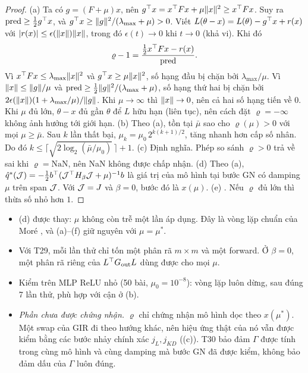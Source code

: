 \begin{proof}
(a) Ta có $g=(F+\mu)x$, nên $g^{\top} x=x^{\top} Fx+\mu\lVert x\rVert^2\ge x^{\top} Fx$. Suy ra $\mathrm{pred}\ge\tfrac12g^{\top} x$, và $g^{\top} x\ge\lVert g\rVert^2/(\lambda_{\max}+\mu)>0$.
Viết $L(\theta-x)=L(\theta)-g^{\top} x+r(x)$ với $|r(x)|\le\epsilon(\lVert x\rVert)\lVert x\rVert$, trong đó $\epsilon(t)\to0$ khi $t\to0$ (khả vi). Khi đó
\[\varrho-1=\frac{\tfrac12x^{\top} Fx-r(x)}{\mathrm{pred}}.\]
Vì $x^{\top} Fx\le\lambda_{\max}\lVert x\rVert^2$ và $g^{\top} x\ge\mu\lVert x\rVert^2$, số hạng đầu bị chặn bởi $\lambda_{\max}/\mu$. Vì $\lVert x\rVert\le\lVert g\rVert/\mu$ và $\mathrm{pred}\ge\tfrac12\lVert g\rVert^2/(\lambda_{\max}+\mu)$, số hạng thứ hai bị chặn bởi $2\epsilon(\lVert x\rVert)(1+\lambda_{\max}/\mu)/\lVert g\rVert$. Khi $\mu\to\infty$ thì $\lVert x\rVert\to0$, nên cả hai số hạng tiến về $0$. Khi $\mu$ đủ lớn, $\theta-x$ đủ gần $\theta$ để $L$ hữu hạn (liên tục), nên cách đặt $\varrho=-\infty$ không ảnh hưởng tới giới hạn.
(b) Theo (a), tồn tại $\bar\mu$ sao cho $\varrho(\mu)>0$ với mọi $\mu\ge\bar\mu$. Sau $k$ lần thất bại, $\mu_k=\mu_0\,2^{k(k+1)/2}$, tăng nhanh hơn cấp số nhân. Do đó $k\le\lceil\sqrt{2\log_2(\bar\mu/\mu_0)}\,\rceil+1$.
(c) Định nghĩa. Phép so sánh $\varrho>0$ trả về sai khi $\varrho=\mathrm{NaN}$, nên NaN không được chấp nhận.
(d) Theo (a), $\hat q^*(\mathcal{J})=-\tfrac12b^{\top}(\mathcal{J}^{\top} H_\beta\mathcal{J}+\mu)^{-1}b$ là giá trị của mô hình tại bước GN có damping $\mu$ trên span $\mathcal{J}$. Với $\mathcal{J}=J$ và $\beta=0$, bước đó là $x(\mu)$.
(e) \cite{madsen2004}. Nếu $\varrho$ đủ lớn thì thừa số nhỏ hơn $1$.
\end{proof}
\begin{hequa}
\begin{itemize}
\item {}(d) được thay: $\mu$ không còn trễ một lần áp dụng. Đây là vòng lặp chuẩn của Moré \cite{more1978}, và (a)--(f) giữ nguyên với $\mu=\mu^*$.
\item Với T29, mỗi lần thử chỉ tốn một phân rã $m\times m$ và một forward. Ở $\beta=0$, một phân rã riêng của $L^{\top} G_{\mathrm{out}}L$ dùng được cho mọi $\mu$.
\item Kiểm trên MLP ReLU nhỏ (50 bài, $\mu_0=10^{-8}$): vòng lặp luôn dừng, sau đúng 7 lần thử, phù hợp với cận ở (b).
\item \emph{Phần chưa được chứng nhận.} $\varrho$ chỉ chứng nhận mô hình dọc theo $x(\mu^*)$. Một swap của GIR đi theo hướng khác, nên hiệu ứng thật của nó vẫn được kiểm bằng các bước nhảy chính xác $j_L,j_{KD}$ ((c)). T30 bảo đảm $\Gamma$ được tính trong cùng mô hình và cùng damping mà bước GN đã được kiểm, không bảo đảm dấu của $\Gamma$ luôn đúng.
\end{itemize}
\end{hequa}

